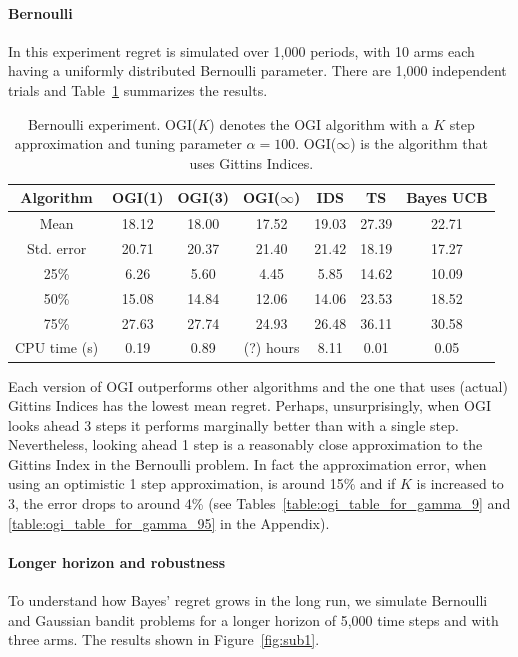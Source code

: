 \paragraph{Bernoulli}
In this experiment regret is simulated over 1,000 periods, with 10 arms each having a uniformly distributed Bernoulli parameter. There are 1,000 independent trials and Table~\ref{table:bernoulli_experiment1} summarizes the results.

\begin{table}[h!]
	\centering
	\begin{tabular}{ccccccc} \toprule
		\textbf{Algorithm} & \textbf{OGI(1)} & \textbf{OGI(3)} &  \textbf{OGI($\infty$)} & \textbf{IDS} & \textbf{TS} & \textbf{Bayes UCB}  \\ \midrule
		Mean &  18.12 & 18.00 & 17.52 & 19.03 & 27.39 & 22.71 \\ 
		Std. error & 20.71 & 20.37 &  21.40 & 21.42 & 18.19 & 17.27 \\ 
		25\% & 6.26 & 5.60 & 4.45 & 5.85 & 14.62 & 10.09 \\
		50\% & 15.08 & 14.84 &12.06 & 14.06 & 23.53 & 18.52 \\
		75\% & 27.63 & 27.74 & 24.93 & 26.48 & 36.11 & 30.58 \\
		CPU time (s) & 0.19 & 0.89 & (?) hours & 8.11 & 0.01 & 0.05  \\ \bottomrule
	\end{tabular}
	\caption[Table caption text]{Bernoulli experiment. OGI($K$) denotes the OGI algorithm with a $K$ step approximation and tuning parameter $\alpha = 100$. OGI($\infty$) is the algorithm that uses Gittins Indices.}
	\label{table:bernoulli_experiment1}
\end{table}
Each version of OGI outperforms other algorithms and the one that uses (actual) Gittins Indices has the lowest mean regret. Perhaps, unsurprisingly, when OGI  looks ahead 3 steps it performs marginally better than with a single step. Nevertheless, looking ahead 1 step is a reasonably close approximation to the Gittins Index in the Bernoulli problem. In fact the approximation error, when using an optimistic 1 step approximation, is around 15\% and if $K$ is increased to 3, the error drops to around 4\% (see Tables~\ref{table:ogi_table_for_gamma_9} and \ref{table:ogi_table_for_gamma_95} in the Appendix).


\paragraph{Longer horizon and robustness}
To understand how Bayes' regret grows in the long run, we simulate Bernoulli and Gaussian bandit problems for a longer horizon of 5,000 time steps and with three arms. The results shown in Figure~\ref{fig:sub1}.

